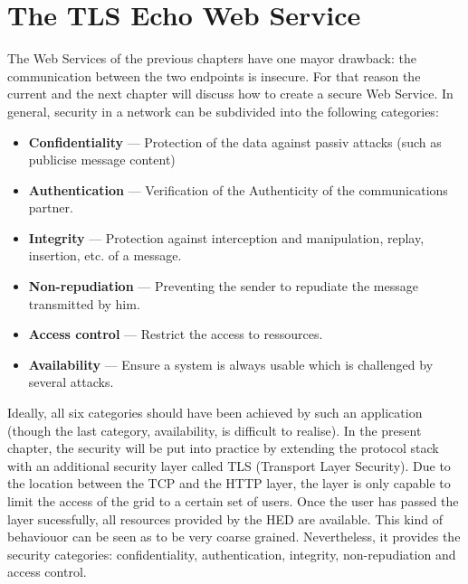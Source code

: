 \chapter{The TLS Echo Web Service}

The Web Services of the previous chapters have one mayor drawback: the communication between the two endpoints is insecure.
For that reason the current and the next chapter will discuss how to create a secure Web Service.
In general, security in a network can be subdivided into the following categories:~\cite{TANNENBAUM_2001}
\begin{itemize}
	\item \textbf{Confidentiality} --- Protection of the data against passiv attacks (such as publicise message content)
	
	\item \textbf{Authentication} --- Verification of the Authenticity  of the communications partner.

	\item \textbf{Integrity} --- Protection against interception and manipulation, replay, insertion, etc.  of a message.

	\item \textbf{Non-repudiation} --- Preventing the sender to repudiate the message transmitted by him.

	\item \textbf{Access control} --- Restrict the access to ressources.

	\item \textbf{Availability} --- Ensure a system is always usable which is challenged by several attacks.

\end{itemize}
%
Ideally, all six categories should have been achieved by such an application (though the last category, availability, is difficult to realise).
In the present chapter, the security will be put into practice by extending the protocol stack with an additional security layer called TLS (Transport Layer Security).
Due to the location between the TCP and the HTTP layer, the layer is only capable to limit the access of the grid to a certain set of users. Once the user has passed the layer sucessfully, all resources provided by the HED are available. This kind of behaviouor can be seen as to be very coarse grained.
Nevertheless, it provides the security categories: confidentiality, authentication, integrity, non-repudiation and access control.\\


